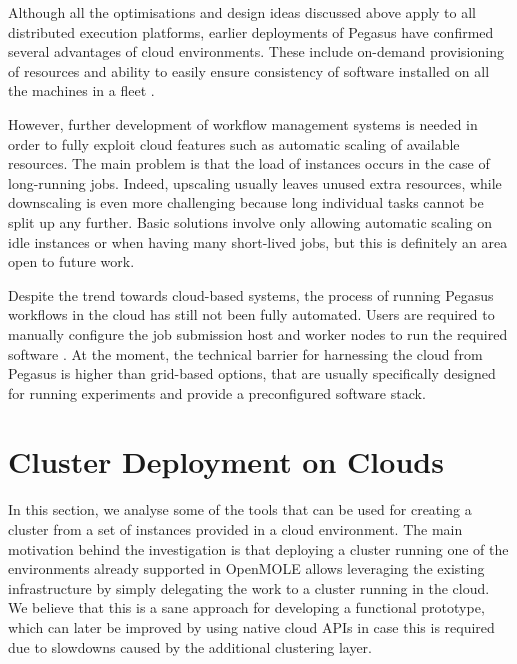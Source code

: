 Although all the optimisations and design ideas discussed above apply to all distributed execution platforms, earlier deployments of Pegasus have confirmed several advantages of cloud environments. These include on-demand provisioning of resources and ability to easily ensure consistency of software installed on all the machines in a fleet \cite{Deelman2016}. 

However, further development of workflow management systems is needed in order to fully exploit cloud features such as automatic scaling of available resources. The main problem is that the load of instances occurs in the case of long-running jobs. Indeed, upscaling usually leaves unused extra resources, while downscaling is even more challenging because long individual tasks cannot be split up any further. Basic solutions involve only allowing automatic scaling on idle instances or when having many short-lived jobs, but this is definitely an area open to future work.

Despite the trend towards cloud-based systems, the process of running Pegasus workflows in the cloud has still not been fully automated. Users are required to manually configure the job submission host and worker nodes to run the required software \cite{PegasusTutorial}. At the moment, the technical barrier for harnessing the cloud from Pegasus is higher than grid-based options, that are usually specifically designed for running experiments and provide a preconfigured software stack.

\section{Cluster Deployment on Clouds}

In this section, we analyse some of the tools that can be used for creating a cluster from a set of instances provided in a cloud environment. The main motivation behind the investigation is that deploying a cluster running one of the environments already supported in OpenMOLE allows leveraging the existing infrastructure by simply delegating the work to a cluster running in the cloud. We believe that this is a sane approach for developing a functional prototype, which can later be improved by using native cloud APIs in case this is required due to slowdowns caused by the additional clustering layer.


